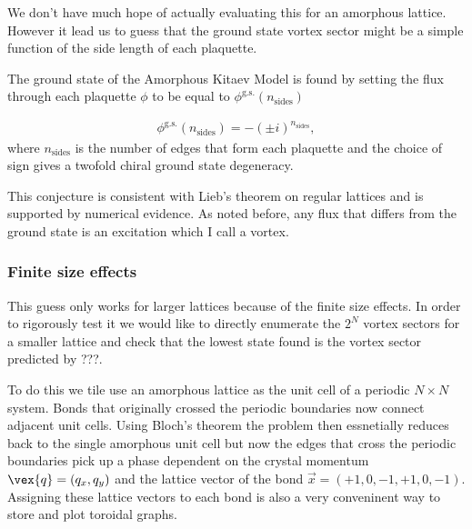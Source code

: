 We don't have much hope of actually evaluating this for an amorphous
lattice. However it lead us to guess that the ground state vortex sector
might be a simple function of the side length of each plaquette.

The ground state of the Amorphous Kitaev Model is found by setting the
flux through each plaquette \(\phi\) to be equal to
\(\phi^{\mathrm{g.s.}}(n_{\mathrm{sides}})\)

\[\begin{aligned}
    \phi^{\mathrm{g.s.}}(n_{\mathrm{sides}}) = -(\pm i)^{n_{\mathrm{sides}}},
\end{aligned}\] where \(n_{\mathrm{sides}}\) is the number of edges that
form each plaquette and the choice of sign gives a twofold chiral ground
state degeneracy.

This conjecture is consistent with Lieb's theorem on regular lattices
\autocite{lieb_flux_1994} and is supported by numerical evidence. As
noted before, any flux that differs from the ground state is an
excitation which I call a vortex.

\hypertarget{finite-size-effects}{%
\subsubsection{Finite size effects}\label{finite-size-effects}}

This guess only works for larger lattices because of the finite size
effects. In order to rigorously test it we would like to directly
enumerate the \(2^N\) vortex sectors for a smaller lattice and check
that the lowest state found is the vortex sector predicted by ???.

To do this we tile use an amorphous lattice as the unit cell of a
periodic \(N\times N\) system. Bonds that originally crossed the
periodic boundaries now connect adjacent unit cells. Using Bloch's
theorem the problem then essnetially reduces back to the single
amorphous unit cell but now the edges that cross the periodic boundaries
pick up a phase dependent on the crystal momentum
\(\vex{q} = (q_x, q_y)\) and the lattice vector of the bond
\(\vec{x} = (+1, 0, -1, +1, 0, -1)\). Assigning these lattice vectors to
each bond is also a very conveninent way to store and plot toroidal
graphs.

